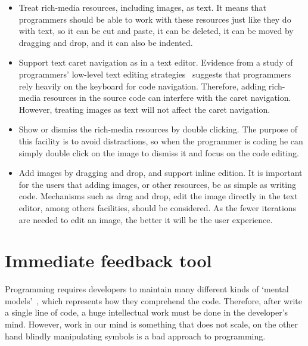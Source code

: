 \begin{itemize}
\item Treat rich-media resources, including images, as text. It means that programmers should be able to work with these resources  just like they do with text, so it can be cut and paste, it can be deleted, it can be moved by dragging and drop, and it can also be indented.

\item Support text caret navigation as in a text editor. Evidence from a study of programmers' low-level text editing strategies~\citep{ko2005design} suggests that programmers rely heavily on the keyboard for code navigation. Therefore, adding rich-media resources in the source code can interfere with the caret navigation. However, treating images as text will not affect the caret navigation.

\item Show or dismiss the rich-media resources by double clicking. The purpose of this facility is to avoid distractions, so when the programmer is coding he can simply double click on the image to dismiss it and focus on the code editing.

\item Add images by dragging and drop, and support inline edition. It is important for the users that adding images, or other resources, be as simple as writing code. Mechanisms such as drag and drop, edit the image directly in the text editor, among others facilities, should be considered. As the fewer iterations are needed to edit an image, the better it will be the user experience.
\end{itemize}

\section{Immediate feedback tool}

Programming requires developers to maintain many different kinds of ‘mental models’~\citep{brooks1977towards,robins2003learning}, which represents how they comprehend the code. Therefore, after write a single line of code, a huge intellectual work must be done in the developer's mind. However, work in our mind is something that does not scale, on the other hand blindly manipulating symbols is a bad approach to programming.

